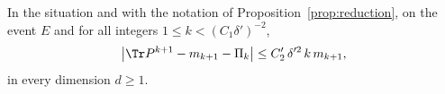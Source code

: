 
\begin{proposition}\label{prop:reduction-alld}
In the situation and with the notation of Proposition~\ref{prop:reduction}, on the event $E$ and for all
integers $1\le k<(C_1\delta')^{-2}$,
\[
 \big|\Tr P^{k+1}-m_{k+1}-\Pi_k\big|\le C_2'\,\delta'^2\,k\,m_{k+1},
\]
in every dimension $d\ge1$.
\end{proposition}

